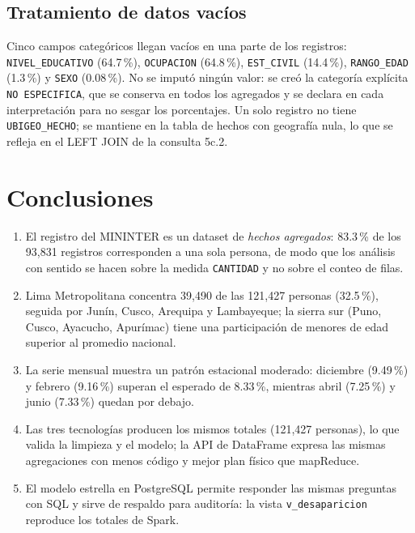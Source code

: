 \documentclass[10pt,a4paper]{article}
\theoremstyle{definition}
\begin{document}
\subsection{Tratamiento de datos vac\'ios}
Cinco campos categ\'oricos llegan vac\'ios en una parte de los registros: \texttt{NIVEL\_EDUCATIVO}
(64.7\,\%), \texttt{OCUPACION} (64.8\,\%), \texttt{EST\_CIVIL} (14.4\,\%), \texttt{RANGO\_EDAD}
(1.3\,\%) y \texttt{SEXO} (0.08\,\%). No se imput\'o ning\'un valor: se cre\'o la categor\'ia
expl\'icita \texttt{NO ESPECIFICA}, que se conserva en todos los agregados y se declara en cada
interpretaci\'on para no sesgar los porcentajes. Un solo registro no tiene \texttt{UBIGEO\_HECHO};
se mantiene en la tabla de hechos con geograf\'ia nula, lo que se refleja en el LEFT JOIN de la
consulta 5c.2.



\section{Conclusiones}

\begin{enumerate}
  \item El registro del MININTER es un dataset de \emph{hechos agregados}: 83.3\,\% de los
        93,831 registros corresponden a una sola persona, de modo que los an\'alisis con sentido
        se hacen sobre la medida \texttt{CANTIDAD} y no sobre el conteo de filas.
  \item Lima Metropolitana concentra 39,490 de las 121,427 personas (32.5\,\%), seguida por
        Jun\'in, Cusco, Arequipa y Lambayeque; la sierra sur (Puno, Cusco, Ayacucho, Apur\'imac)
        tiene una participaci\'on de menores de edad superior al promedio nacional.
  \item La serie mensual muestra un patr\'on estacional moderado: diciembre (9.49\,\%) y febrero
        (9.16\,\%) superan el esperado de 8.33\,\%, mientras abril (7.25\,\%) y junio (7.33\,\%)
        quedan por debajo.
  \item Las tres tecnolog\'ias producen los mismos totales (121,427 personas), lo que valida la
        limpieza y el modelo; la API de DataFrame expresa las mismas agregaciones con menos
        c\'odigo y mejor plan f\'isico que mapReduce.
  \item El modelo estrella en PostgreSQL permite responder las mismas preguntas con SQL y
        sirve de respaldo para auditor\'ia: la vista \texttt{v\_desaparicion} reproduce los
        totales de Spark.
\end{enumerate}
\end{document}
